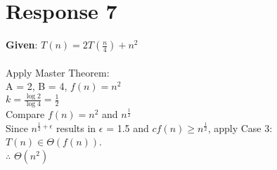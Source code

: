 \documentclass[12pt, a4paper]{article}
\begin{document}
\section*{\centering Response 7}
    \textbf{Given}: \(T(n)=2T(\frac{n}{4})+n^2\)\\
    \\
    Apply Master Theorem:\\
    A = 2, B = 4, \(f(n) = n^2\)\\
    \(k = \frac{\log{2}}{\log{4}} = \frac{1}{2}\)\\
    Compare \(f(n) = n^2\) and \(n^{\frac{1}{2}}\)\\
    Since \(n^{\frac{1}{2}+\epsilon}\) results in $\epsilon$ = 1.5 and \(cf(n) \geq n^{\frac{1}{2}}\), apply Case 3:\\
    \(T(n) \in \Theta{(f(n))}\).\\
    $\therefore$ $\Theta{(n^{2})}$
\end{document}
